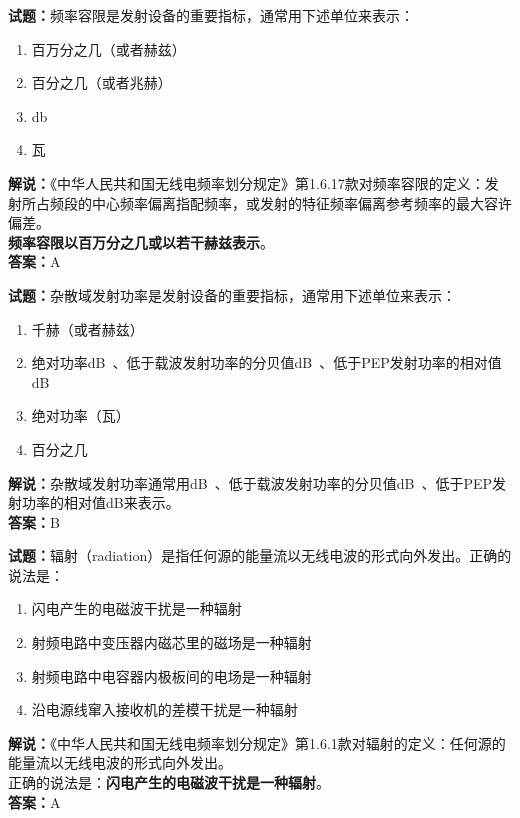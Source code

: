\documentclass{ctexbook}
\begin{document}
\vspace{\baselineskip}

\noindent\textbf{试题：}频率容限是发射设备的重要指标，通常用下述单位来表示：
\begin{enumerate}[leftmargin=3em]
  \item 百万分之几（或者赫兹）
  \item 百分之几（或者兆赫）
  \item \unit{\decibel}
  \item 瓦
\end{enumerate}
\noindent\textbf{解说：}《中华人民共和国无线电频率划分规定》第1.6.17款对频率容限的定义：发射所占频段的中心频率偏离指配频率，或发射的特征频率偏离参考频率的最大容许偏差。\\\textbf{频率容限以百万分之几或以若干赫兹表示}。\\\noindent\textbf{答案：}A

\vspace{\baselineskip}

\noindent\textbf{试题：}杂散域发射功率是发射设备的重要指标，通常用下述单位来表示：
\begin{enumerate}[leftmargin=3em]
  \item 千赫（或者赫兹）
  \item 绝对功率\unit[qualifier-mode=combine]{\deci\bel{}}、低于载波发射功率的分贝值\unit[qualifier-mode=combine]{\deci\bel{}}、低于PEP发射功率的相对值\unit{\dB}
  \item 绝对功率（瓦）
  \item 百分之几
\end{enumerate}
\noindent\textbf{解说：}杂散域发射功率通常用\unit[qualifier-mode=combine]{\deci\bel{}}、低于载波发射功率的分贝值\unit[qualifier-mode=combine]{\deci\bel{}}、低于PEP发射功率的相对值\unit{\dB}来表示。\\\noindent\textbf{答案：}B

\vspace{\baselineskip}

\noindent\textbf{试题：}辐射（radiation）是指任何源的能量流以无线电波的形式向外发出。正确的说法是：
\begin{enumerate}[leftmargin=3em]
  \item 闪电产生的电磁波干扰是一种辐射
  \item 射频电路中变压器内磁芯里的磁场是一种辐射
  \item 射频电路中电容器内极板间的电场是一种辐射
  \item 沿电源线窜入接收机的差模干扰是一种辐射
\end{enumerate}
\textbf{解说：}《中华人民共和国无线电频率划分规定》第1.6.1款对辐射的定义：任何源的能量流以无线电波的形式向外发出。\\正确的说法是：\textbf{闪电产生的电磁波干扰是一种辐射}。\\\noindent\textbf{答案：}A
\end{document}
